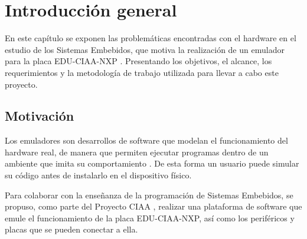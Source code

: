 

\newcommand{\keyword}[1]{\textbf{#1}}
\newcommand{\tabhead}[1]{\textbf{#1}}
\newcommand{\code}[1]{\texttt{#1}}
\newcommand{\file}[1]{\texttt{\bfseries#1}}
\newcommand{\option}[1]{\texttt{\itshape#1}}
\newcommand{\grados}{$^{\circ}$}


\chapter{Introducción general} %
\label{IntroGeneral}


En este capítulo se exponen las problemáticas encontradas con el hardware en el estudio de los Sistemas Embebidos, que motiva la realización de un emulador para la placa EDU-CIAA-NXP \citep{EDU-CIAA-NXP}. Presentando los objetivos, el alcance, los requerimientos y la metodología de trabajo utilizada para llevar a cabo este proyecto.

\section{Motivación}

Los emuladores son desarrollos de software que modelan el funcionamiento del hardware real, de manera que permiten ejecutar programas dentro de un ambiente que imita su comportamiento \citep{sanchezqemu}. De esta forma un usuario puede simular su código antes de instalarlo en el dispositivo físico.

Para colaborar con la enseñanza de la programación de Sistemas Embebidos, se propuso, como parte del Proyecto CIAA \citep{CIAA}, realizar una plataforma de software que emule el funcionamiento de la placa EDU-CIAA-NXP, así como los periféricos y placas que se pueden conectar a ella.

